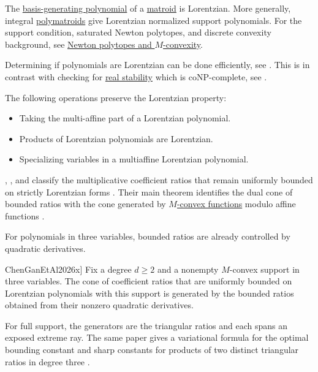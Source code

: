 The \hyperref[basisGeneratingPolynomial]{basis-generating polynomial} of a
\hyperref[matroid]{matroid} is Lorentzian.  More generally, integral
\hyperref[polymatroids]{polymatroids} give Lorentzian normalized support
polynomials.  For the support condition, saturated Newton polytopes, and
discrete convexity background, see
\hyperref[newtonPolytopes]{Newton polytopes and $M$-convexity}.

Determining if polynomials are Lorentzian can be done efficiently, see \cite{Chin2024x}.
This is in contrast with checking for \hyperref[stablePolynomial]{real stability} which is coNP-complete, see \cite{Chin2024x}.


The following operations preserve the Lorentzian property:
\begin{itemize}
\item Taking the multi-affine part of a Lorentzian polynomial.
\item Products of Lorentzian polynomials are Lorentzian.
\item Specializing variables in a multiaffine Lorentzian polynomial.
\end{itemize}

, , and 
classify the multiplicative coefficient ratios that remain uniformly bounded
on strictly Lorentzian forms \cite{BathijaRohatgiSoskin2026x}.  Their main
theorem identifies the dual cone of bounded ratios with the cone generated by
\hyperref[MConvexity]{\(M\)-convex functions} modulo affine functions
\cite[Thm.~A]{BathijaRohatgiSoskin2026x}.

For polynomials in three variables, bounded ratios are already controlled by
quadratic derivatives.

\begin{theorem}[Chen--Gan--Liu--Wang--Wu,
\cite[Thm.~1]{ChenGanEtAl2026x}]
Fix a degree $d\geq2$ and a nonempty $M$-convex support in three variables.
The cone of coefficient ratios that are uniformly bounded on Lorentzian
polynomials with this support is generated by the bounded ratios obtained
from their nonzero quadratic derivatives.
\end{theorem}

For full support, the generators are the triangular ratios and each spans an
exposed extreme ray.  The same paper gives a variational formula for the
optimal bounding constant and sharp constants for products of two distinct
triangular ratios in degree three
\cite[Thms.~4.6 and 6.3]{ChenGanEtAl2026x}.



